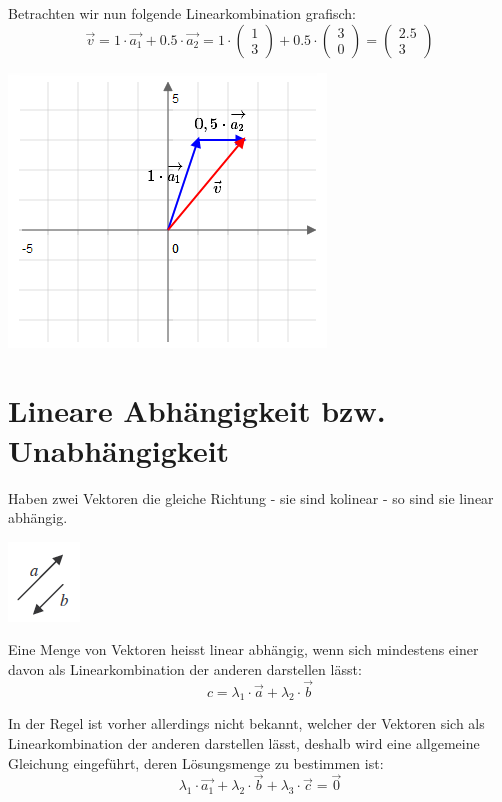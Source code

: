 Betrachten wir nun folgende Linearkombination grafisch:
\begin{equation*}
\vec{v} = 1\cdot \vec{a_1} + 0.5\cdot \vec{a_2}=1\cdot \begin{pmatrix}1\\3\end{pmatrix} + 0.5 \cdot \begin{pmatrix}3\\0\end{pmatrix} = \begin{pmatrix}2.5\\3\end{pmatrix}
\end{equation*}
\begin{center}\includegraphics[scale=1.1]{imgs/Linearkombination1.png}\end{center}
\section{Lineare Abhängigkeit bzw. Unabhängigkeit}
Haben zwei Vektoren die gleiche Richtung - sie sind kolinear - so sind sie linear abhängig.
\begin{center}\includegraphics[scale=0.9]{imgs/pic2.png}\end{center}
\begin{mydef}
Eine Menge von Vektoren heisst linear abhängig, wenn sich mindestens einer davon als Linearkombination der anderen darstellen lässt:
\begin{equation*}
c=\lambda_1 \cdot \vec{a} + \lambda_2 \cdot \vec{b}
\end{equation*}
\end{mydef}
\noindent In der Regel ist vorher allerdings nicht bekannt, welcher der Vektoren sich als Linearkombination der anderen darstellen lässt, deshalb wird eine allgemeine Gleichung eingeführt, deren Lösungsmenge zu bestimmen ist:
\begin{equation*}
\lambda_1 \cdot \vec{a_1} + \lambda_2 \cdot \vec{b} + \lambda_3 \cdot \vec{c} = \vec{0}
\end{equation*}
